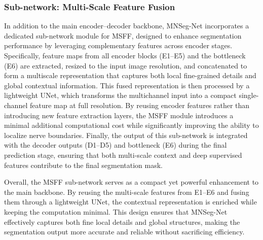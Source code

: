 \subsubsection{Sub-network: Multi-Scale Feature Fusion}
\noindent
In addition to the main encoder–decoder backbone, MNSeg-Net incorporates a dedicated sub-network module for MSFF, designed to enhance segmentation performance by leveraging complementary features across encoder stages. Specifically, feature maps from all encoder blocks (E1–E5) and the bottleneck (E6) are extracted, resized to the input image resolution, and concatenated to form a multiscale representation that captures both local fine-grained details and global contextual information. This fused representation is then processed by a lightweight UNet, which transforms the multichannel input into a compact single-channel feature map at full resolution. By reusing encoder features rather than introducing new feature extraction layers, the MSFF module introduces a minimal additional computational cost while significantly improving the ability to localize nerve boundaries. Finally, the output of this sub-network is integrated with the decoder outputs (D1–D5) and bottleneck (E6) during the final prediction stage, ensuring that both multi-scale context and deep supervised features contribute to the final segmentation mask.

Overall, the MSFF sub-network serves as a compact yet powerful enhancement to the main backbone. By reusing the multi-scale features from E1–E6 and fusing them through a lightweight UNet, the contextual representation is enriched while keeping the computation minimal. This design ensures that MNSeg-Net effectively captures both fine local details and global structures, making the segmentation output more accurate and reliable without sacrificing efficiency.




